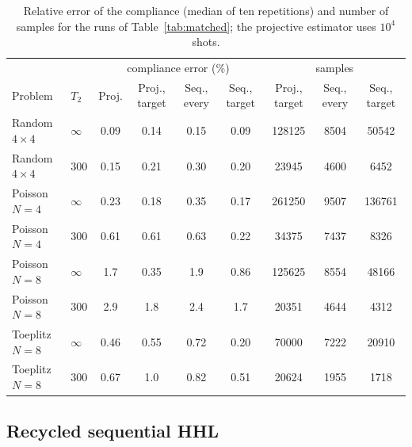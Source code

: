 \documentclass[journal]{IEEEtran}
\begin{document}
\begin{table}[t]
\caption{Relative error of the compliance (median of ten repetitions) and number of samples for the runs of Table~\ref{tab:matched}; the projective estimator uses $10^4$ shots.}
\label{tab:matchedC}
\centering\footnotesize
\begin{tabular}{llccccccc}
\toprule
 & & \multicolumn{4}{c}{compliance error (\%)} & \multicolumn{3}{c}{samples}\\
Problem & $T_2$ & Proj. & Proj., target & Seq., every & Seq., target & Proj., target & Seq., every & Seq., target\\
\midrule
Random $4\times4$ & $\infty$ & 0.09 & 0.14 & 0.15 & 0.09 & 128125 & 8504 & 50542\\
Random $4\times4$ & 300 & 0.15 & 0.21 & 0.30 & 0.20 & 23945 & 4600 & 6452\\
Poisson $N=4$ & $\infty$ & 0.23 & 0.18 & 0.35 & 0.17 & 261250 & 9507 & 136761\\
Poisson $N=4$ & 300 & 0.61 & 0.61 & 0.63 & 0.22 & 34375 & 7437 & 8326\\
Poisson $N=8$ & $\infty$ & 1.7 & 0.35 & 1.9 & 0.86 & 125625 & 8554 & 48166\\
Poisson $N=8$ & 300 & 2.9 & 1.8 & 2.4 & 1.7 & 20351 & 4644 & 4312\\
Toeplitz $N=8$ & $\infty$ & 0.46 & 0.55 & 0.72 & 0.20 & 70000 & 7222 & 20910\\
Toeplitz $N=8$ & 300 & 0.67 & 1.0 & 0.82 & 0.51 & 20624 & 1955 & 1718\\
\bottomrule
\end{tabular}
\end{table}

\subsection{Recycled sequential HHL}
\end{document}
